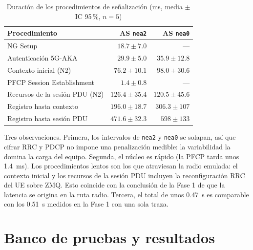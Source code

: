 \documentclass[conference]{IEEEtran}
\begin{document}
\begin{table}[!t]
\caption{Duración de los procedimientos de señalización (ms, media $\pm$ IC 95\,\%, $n=5$)}
\label{tab:tiempos}
\centering
\footnotesize
\renewcommand{\arraystretch}{1.12}
\begin{tabular}{p{3.6cm}rr}
\toprule
\textbf{Procedimiento} & \textbf{AS \texttt{nea2}} & \textbf{AS \texttt{nea0}} \\
\midrule
NG Setup & $18.7\pm7.0$ & --- \\
Autenticación 5G-AKA & $29.9\pm5.0$ & $35.9\pm12.8$ \\
Contexto inicial (N2) & $76.2\pm10.1$ & $98.0\pm30.6$ \\
PFCP Session Establishment & $1.4\pm0.8$ & --- \\
Recursos de la sesión PDU (N2) & $126.4\pm35.4$ & $120.5\pm45.6$ \\
Registro hasta contexto & $196.0\pm18.7$ & $306.3\pm107$ \\
Registro hasta sesión PDU & $\mathbf{471.6\pm32.3}$ & $598\pm133$ \\
\bottomrule
\end{tabular}
\end{table}

Tres observaciones. Primera, los intervalos de \texttt{nea2} y \texttt{nea0} se solapan, así que cifrar RRC y PDCP no impone una penalización medible: la variabilidad la domina la carga del equipo. Segunda, el núcleo es rápido (la PFCP tarda unos 1.4~ms). Los procedimientos lentos son los que atraviesan la radio emulada: el contexto inicial y los recursos de la sesión PDU incluyen la reconfiguración RRC del UE sobre ZMQ. Esto coincide con la conclusión de la Fase 1 de que la latencia se origina en la ruta radio. Tercera, el total de unos 0.47~s es comparable con los 0.51~s medidos en la Fase 1 con una sola traza.

\section{Banco de pruebas y resultados}
\label{sec:res}
\end{document}
